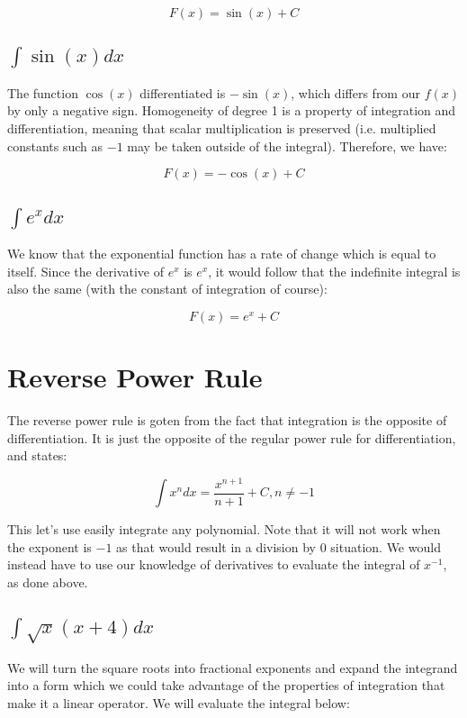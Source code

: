 \documentclass[12pt]{article}
\begin{document}
$$
    F(x) = \sin(x) + C
$$

\subsection{$\int \sin(x) dx$}

The function $\cos(x)$ differentiated is $-\sin(x)$, which differs from our $f(x)$ by only a negative sign. Homogeneity of degree 1 is a property of integration and differentiation, meaning that scalar multiplication is preserved (i.e. multiplied constants such as $-1$ may be taken outside of the integral). Therefore, we have:

$$
    F(x) = -\cos(x) + C
$$

\subsection{$\int e^x dx$}

We know that the exponential function has a rate of change which is equal to itself.
Since the derivative of $e^x$ is $e^x$, it would follow that the indefinite integral is also the same (with the constant of integration of course):

$$
    F(x) = e^x + C
$$

\section{Reverse Power Rule}

The reverse power rule is goten from the fact that integration is the opposite of differentiation.
It is just the opposite of the regular power rule for differentiation, and states:

$$
    \int x^n dx = \frac{x^{n+1}}{n+1} + C, n \neq -1
$$

This let's use easily integrate any polynomial.
Note that it will not work when the exponent is $-1$ as that would result in a division by $0$ situation.
We would instead have to use our knowledge of derivatives to evaluate the integral of $x^{-1}$, as done above.

\subsection{$\int \sqrt{x}(x+4) dx$}

We will turn the square roots into fractional exponents and expand the integrand into a form which we could take advantage of the properties of integration that make it a linear operator. We will evaluate the integral below:
\end{document}
